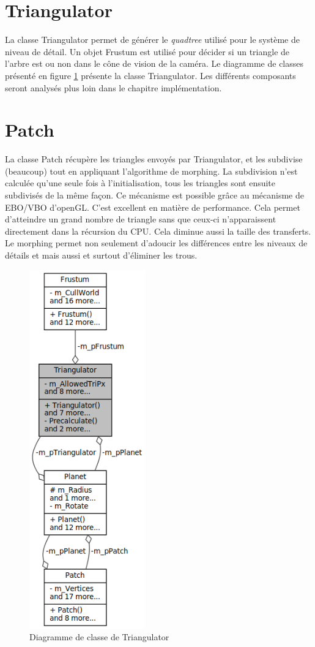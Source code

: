   \section{Triangulator}
  La classe Triangulator permet de générer le \emph{quadtree} utilisé pour le système de niveau de détail.
  Un objet Frustum est utilisé pour décider si un triangle de l'arbre est ou non dans le cône 
  de vision de la caméra. Le diagramme de classes présenté en figure \ref{fig:plan} présente la classe
  Triangulator. Les différents composants seront analysés plus loin dans le chapitre implémentation.
  
  \section{Patch}
  La classe Patch récupère les triangles envoyés par Triangulator, et les subdivise (beaucoup) tout en appliquant l'algorithme de morphing. La subdivision n'est calculée qu'une seule fois à l'initialisation, tous les triangles sont ensuite subdivisés de la même façon. Ce mécanisme est possible grâce au mécanisme de EBO/VBO d'openGL. C'est excellent en matière de performance. Cela permet d'atteindre un grand nombre de triangle sans que ceux-ci n'apparaissent directement dans la récursion du CPU. Cela diminue aussi la taille des transferts.
  Le morphing permet non seulement d'adoucir les différences entre les niveaux de détails et mais aussi et surtout d'éliminer les trous.
  
  
  \begin{figure}
  \centering
  \includegraphics[width=5cm]{img/tri_class2.png}
  \caption{Diagramme de classe de Triangulator}
  \label{fig:plan}
  \end{figure}
  
